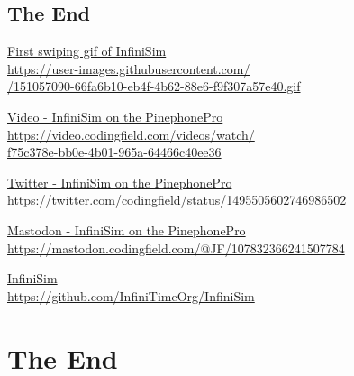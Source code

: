 \documentclass{beamer}
\begin{document}
\subsection{The End}
\begin{frame}{}

  \href{https://user-images.githubusercontent.com/9076163/151057090-66fa6b10-eb4f-4b62-88e6-f9f307a57e40.gif}{
    First swiping gif of InfiniSim\\
  \quad \small https://user-images.githubusercontent.com/\\
  \quad{}/151057090-66fa6b10-eb4f-4b62-88e6-f9f307a57e40.gif}

  \medskip
  \href{https://video.codingfield.com/videos/watch/f75c378e-bb0e-4b01-965a-64466c40ee36}{
    Video - InfiniSim on the PinephonePro\\
  \quad \small https://video.codingfield.com/videos/watch/\\
  \quad\quad f75c378e-bb0e-4b01-965a-64466c40ee36}

  \medskip
  \href{https://twitter.com/codingfield/status/1495505602746986502}{
    Twitter - InfiniSim on the PinephonePro\\
  \quad \small https://twitter.com/codingfield/status/1495505602746986502}

  \medskip
  \href{https://mastodon.codingfield.com/@JF/107832366241507784}{
    Mastodon - InfiniSim on the PinephonePro\\
  \quad \small https://mastodon.codingfield.com/@JF/107832366241507784}

  \medskip
  \href{https://github.com/InfiniTimeOrg/InfiniSim}{
    InfiniSim\\
  \quad \small https://github.com/InfiniTimeOrg/InfiniSim}

\end{frame}

\section{The End}
\end{document}
